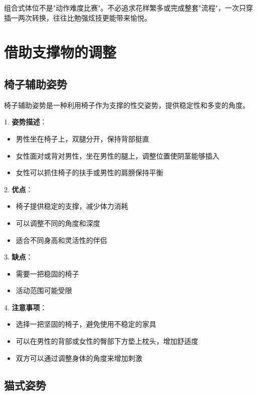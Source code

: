 \documentclass[12pt,UTF8]{ctexbook}
\begin{document}
\begin{tcolorbox}[colback=pink!5!white,colframe=red!50!black,title=贴心小叮咛]
组合式体位不是"动作难度比赛"。不必追求花样繁多或完成整套"流程"，一次只穿插一两次转换，往往比勉强炫技更能带来愉悦。
\end{tcolorbox}

\section{借助支撑物的调整}

\subsection{椅子辅助姿势}

椅子辅助姿势是一种利用椅子作为支撑的性交姿势，提供稳定性和多变的角度。

1. \textbf{姿势描述}：
  \begin{itemize}
  \item 男性坐在椅子上，双腿分开，保持背部挺直
  \item 女性面对或背对男性，坐在男性的腿上，调整位置使阴茎能够插入
  \item 女性可以抓住椅子的扶手或男性的肩膀保持平衡
  \end{itemize}

2. \textbf{优点}：
  \begin{itemize}
  \item 椅子提供稳定的支撑，减少体力消耗
  \item 可以调整不同的角度和深度
  \item 适合不同身高和灵活性的伴侣
  \end{itemize}

3. \textbf{缺点}：
  \begin{itemize}
  \item 需要一把稳固的椅子
  \item 活动范围可能受限
  \end{itemize}

4. \textbf{注意事项}：
  \begin{itemize}
  \item 选择一把坚固的椅子，避免使用不稳定的家具
  \item 可以在男性的背部或女性的臀部下方垫上枕头，增加舒适度
  \item 双方可以通过调整身体的角度来增加刺激
  \end{itemize}

\subsection{猫式姿势}
\end{document}

